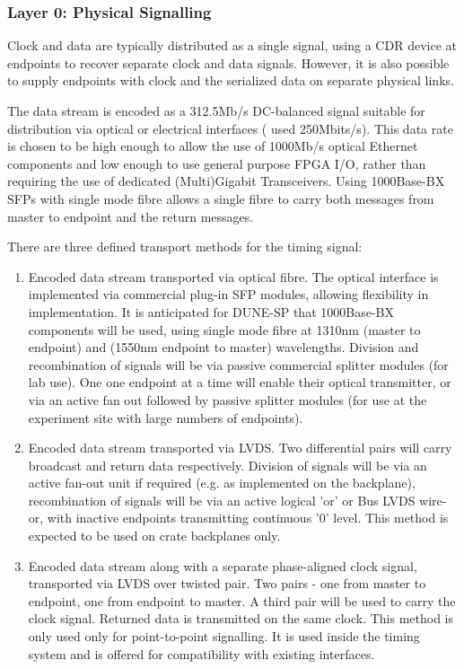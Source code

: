 \documentclass{dune}
\begin{document}
\subsubsection{Layer 0: Physical Signalling}

Clock and data are typically distributed as a single signal, using a CDR device at endpoints to recover separate clock and data signals. However, it is also possible to supply endpoints with clock and the serialized data on separate physical links. 

The data stream is encoded as a 312.5Mb/s DC-balanced signal suitable for distribution via optical or electrical interfaces ( used 250Mbits/s). This data rate is chosen to be high enough to allow the use of 1000Mb/s optical Ethernet components and low enough to use general purpose FPGA I/O, rather than requiring the use of dedicated (Multi)Gigabit Transceivers. Using 1000Base-BX SFPs with single mode fibre allows a single fibre to carry both messages from master to endpoint and the return messages.

There are three defined transport methods for the timing signal:

\begin{enumerate}
	\item Encoded data stream transported via optical fibre. The optical interface is implemented via commercial plug-in SFP modules, allowing flexibility in implementation. It is anticipated for DUNE-SP that 1000Base-BX components will be used, using single mode fibre at 1310nm (master to endpoint) and (1550nm endpoint to master) wavelengths. Division and recombination of signals will be via passive commercial splitter modules (for lab use). One one endpoint at a time will enable their optical transmitter, or via an active fan out followed by passive splitter modules (for use at the experiment site with large numbers of endpoints).
	\item Encoded data stream transported via LVDS. Two differential pairs will carry broadcast and return data respectively. Division of signals will be via an active fan-out unit if required (e.g. as implemented on the  backplane), recombination of signals will be via an active logical 'or' or Bus LVDS wire-or, with inactive endpoints transmitting continuous '0' level. This method is expected to be used on crate backplanes only.
	\item Encoded data stream along with a separate phase-aligned clock signal, transported via LVDS over twisted pair. Two pairs - one from master to endpoint, one from endpoint to master. A third pair will be used to carry the clock signal. Returned data is transmitted on the same clock. This method is only used only for point-to-point signalling. It is used inside the timing system and is offered for compatibility with existing interfaces.
\end{enumerate}
\end{document}
